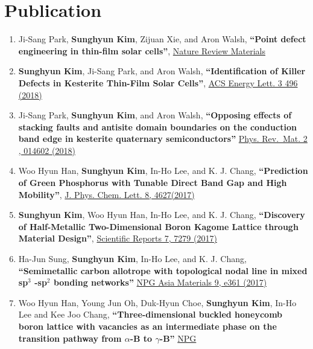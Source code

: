 \hypertarget{publication}{%
\section{Publication}\label{publication}}

\begin{enumerate}
\def\labelenumi{\arabic{enumi}.}
\item
  Ji-Sang Park, \textbf{Sunghyun Kim}, Zijuan Xie, and Aron Walsh,
  \textbf{``Point defect engineering in thin-film solar cells''},
  \href{https://doi.org/10.1038/s41578-018-0026-7}{Nature Review
  Materials}
\item
  \textbf{Sunghyun Kim}, Ji-Sang Park, and Aron Walsh,
  \textbf{``Identification of Killer Defects in Kesterite Thin-Film
  Solar Cells''},
  \href{https://pubs.acs.org/doi/abs/10.1021/acsenergylett.7b01313}{ACS
  Energy Lett. 3 496 (2018)}
\item
  Ji-Sang Park, \textbf{Sunghyun Kim}, and Aron Walsh,
  \textbf{``Opposing effects of stacking faults and antisite domain
  boundaries on the conduction band edge in kesterite quaternary
  semiconductors''}
  \href{https://journals.aps.org/prmaterials/abstract/10.1103/PhysRevMaterials.2.014602}{Phys.
  Rev.~Mat. 2 , 014602 (2018)}
\item
  Woo Hyun Han, \textbf{Sunghyun Kim}, In-Ho Lee, and K. J. Chang,
  \textbf{``Prediction of Green Phosphorus with Tunable Direct Band Gap
  and High Mobility''},
  \href{https://pubs.acs.org/doi/10.1021/acs.jpclett.7b02153}{J. Phys.
  Chem. Lett. 8, 4627(2017)}
\item
  \textbf{Sunghyun Kim}, Woo Hyun Han, In-Ho Lee, and K. J. Chang,
  \textbf{``Discovery of Half-Metallic Two-Dimensional Boron Kagome
  Lattice through Material Design''},
  \href{https://www.nature.com/articles/s41598-017-07518-9}{Scientific
  Reports 7, 7279 (2017)}
\item
  Ha-Jun Sung, \textbf{Sunghyun Kim}, In-Ho Lee, and K. J. Chang,
  \textbf{``Semimetallic carbon allotrope with topological nodal line in
  mixed sp\(^3\) -sp\(^2\) bonding networks''}
  \href{http://www.nature.com/am/journal/v9/n3/full/am201726a.html}{NPG
  Asia Materials 9, e361 (2017)}
\item
  Woo Hyun Han, Young Jun Oh, Duk-Hyun Choe, \textbf{Sunghyun Kim},
  In-Ho Lee and Kee Joo Chang, \textbf{``Three-dimensional buckled
  honeycomb boron lattice with vacancies as an intermediate phase on the
  transition pathway from \(\alpha\)-B to \(\gamma\)-B''}
  \href{http://www.nature.com/am/journal/v9/n7/full/am201798a.html}{NPG
}
\end{enumerate}
